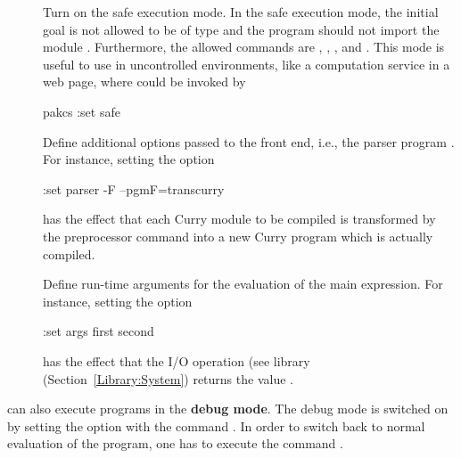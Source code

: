 \begin{description}
\item[]
Turn on the safe execution mode.
In the safe execution mode, the initial goal is
not allowed to be of type  and the program should not
import the module .
Furthermore, the allowed commands are
, , , and .
This mode is useful to use \CYS in uncontrolled environments,
like a computation service in a web page, where \CYS could
be invoked by
\begin{curry}
pakcs :set safe
\end{curry}

\item[]
Define additional options passed to the \CYS front end, i.e.,
the parser program .
For instance, setting the option
\begin{curry}
:set parser -F --pgmF=transcurry
\end{curry}
has the effect that each Curry module to be compiled is
transformed by the preprocessor command 
into a new Curry program which is actually compiled.

\item[]
Define run-time arguments for the evaluation
of the main expression.
For instance, setting the option
\begin{curry}
:set args first second
\end{curry}
has the effect that the I/O operation 
(see library  (Section~\ref{Library:System})
returns the value .

\end{description}
%
\bigskip
%
\CYS can also execute programs in the {\bf debug mode}.
The debug mode is switched on by setting the  option
with the command . In order to switch
back to normal evaluation of the program, one has to execute
the command .

